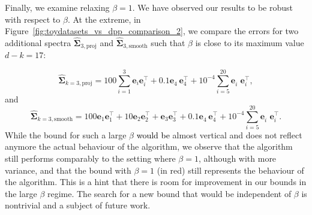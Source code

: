 \documentclass[twoside,11pt]{book}
\newcommand{\rev}[1]{\textcolor{black}{#1}}
\numberwithin{theorem}{chapter}
\numberwithin{definition}{chapter}
\numberwithin{proposition}{chapter}
\numberwithin{corollary}{chapter}
\numberwithin{example}{chapter}
\numberwithin{lemma}{chapter}
\numberwithin{assumption}{chapter}
\numberwithin{equation}{chapter}
\numberwithin{figure}{chapter}
\DeclareMathOperator{\Tran}{\intercal}
\begin{document}
Finally, we examine relaxing $\beta=1$. We have observed our results to be robust with respect to $\beta$. At the extreme, in Figure~\ref{fig:toydatasets_vs_dpp_comparison_2}, we compare the errors for two additional spectra $\hat{\bm{\Sigma}}_{3,\text{proj}}$ and $\hat{\bm{\Sigma}}_{3,\text{smooth}}$ such that $\beta$ is close to its maximum value $d-k = 17$:

$$
    \hat{\bm{\Sigma}}_{k=3,\text{proj}} = 100 \sum\limits_{i = 1}^{3} \bm{e}_{i}\bm{e}_{i}^{\Tran} + 0.1\bm{e}_{4}^{\phantom{\Tran}}\bm{e}_{4}^{\Tran} + 10^{-4} \sum\limits_{i = 5}^{20} \bm{e}_{i}^{\phantom{\Tran}}\bm{e}_{i}^{\Tran}, $$
and
$$
    \hat{\bm{\Sigma}}_{k=3,\text{smooth}} = 100\bm{e}_{1}\bm{e}_{1}^{\Tran} + 10\bm{e}_{2}\bm{e}_{2}^{\Tran} + \bm{e}_{3}\bm{e}_{3}^{\Tran} + 0.1\bm{e}_{4}^{\phantom{\Tran}}\bm{e}_{4}^{\Tran} + 10^{-4} \sum\limits_{i = 5}^{20} \bm{e}_{i}^{\phantom{\Tran}}\bm{e}_{i}^{\Tran}.$$
 While the bound for such a large $\beta$ \rev{would be} almost vertical and does not reflect anymore the actual behaviour of the algorithm, we observe that the algorithm still performs comparably to the setting where $\beta=1$, although with more variance, and that the bound with $\beta = 1$ (in red) still represents the behaviour of the algorithm. This is a hint that there is room for improvement in our bounds in the large $\beta$ regime. The search for a new bound that would be independent of $\beta$ is nontrivial and a subject of future work.
\end{document}
